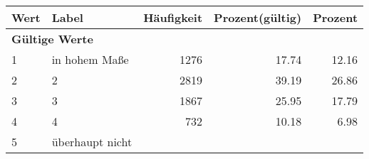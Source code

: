      \begin{longtable}{lXrrr}
     \toprule
     \textbf{Wert} & \textbf{Label} & \textbf{Häufigkeit} & \textbf{Prozent(gültig)} & \textbf{Prozent} \\
     \endhead
     \midrule
     \multicolumn{5}{l}{\textbf{Gültige Werte}}\\

     1 &
     \multicolumn{1}{X}{ in hohem Maße   } &


       \num{1276} &
       \num[round-mode=places,round-precision=2]{17.74} &
         \num[round-mode=places,round-precision=2]{12.16} \\

     2 &
     \multicolumn{1}{X}{ 2   } &


       \num{2819} &
       \num[round-mode=places,round-precision=2]{39.19} &
         \num[round-mode=places,round-precision=2]{26.86} \\

     3 &
     \multicolumn{1}{X}{ 3   } &


       \num{1867} &
       \num[round-mode=places,round-precision=2]{25.95} &
         \num[round-mode=places,round-precision=2]{17.79} \\

     4 &
     \multicolumn{1}{X}{ 4   } &


       \num{732} &
       \num[round-mode=places,round-precision=2]{10.18} &
         \num[round-mode=places,round-precision=2]{6.98} \\

     5 &
     \multicolumn{1}{X}{ überhaupt nicht   } &



\end{longtable}
